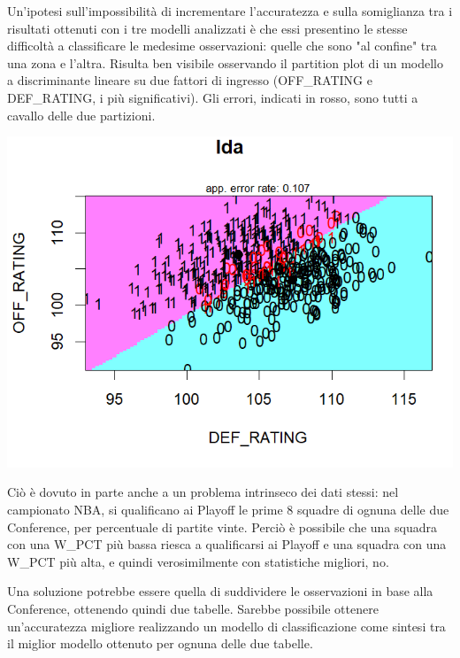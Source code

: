\documentclass[11pt,a4paper]{article}
\begin{document}
\hspace{-0.7cm}
\vspace{0.1cm}
\begin{minipage}{0.5\textwidth} 
\vspace{0.1cm}
\setlength{\parindent}{1.5em}
\indent Un'ipotesi sull'impossibilità di incrementare l'accuratezza e sulla somiglianza tra i risultati ottenuti con i tre modelli analizzati è che essi presentino le stesse difficoltà a classificare le medesime osservazioni: quelle che sono "al confine" tra una zona e l'altra.
Risulta ben visibile osservando il partition plot di un modello a discriminante lineare su due fattori di ingresso (OFF\_RATING e DEF\_RATING, i più significativi). Gli errori, indicati in rosso, sono tutti a cavallo delle due partizioni.
\end{minipage}
\begin{minipage}{0.5\textwidth} 
    \hspace{0.5cm}
    \includegraphics[scale=.6]{imgs/partition_plot_lda.png}
\end{minipage}

Ciò è dovuto in parte anche a un problema intrinseco dei dati stessi: nel campionato NBA, si qualificano ai Playoff le prime 8 squadre di ognuna delle due Conference, per percentuale di partite vinte. Perciò è possibile che una squadra con una W\_PCT più bassa riesca a qualificarsi ai Playoff e una squadra con una W\_PCT più alta, e quindi verosimilmente con statistiche migliori, no.

Una soluzione potrebbe essere quella di suddividere le osservazioni in base alla Conference, ottenendo quindi due tabelle.
Sarebbe possibile ottenere un'accuratezza migliore realizzando un modello di classificazione come sintesi tra il miglior modello ottenuto per ognuna delle due tabelle.
\end{document}
